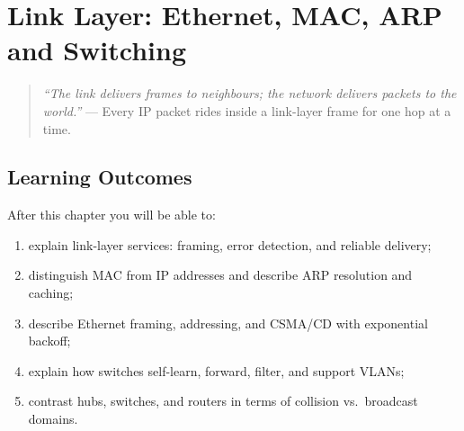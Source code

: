 \chapter{Link Layer: Ethernet, MAC, ARP and Switching}\label{ch:link}
\begin{quote}
\emph{``The link delivers frames to neighbours; the network delivers packets to the world.''} --- Every IP packet rides inside a link-layer frame for one hop at a time.
\end{quote}
\noindent{}
\vspace{0.4em}
\section*{Learning Outcomes}
After this chapter you will be able to:
\begin{enumerate}[label=(L\arabic*)]
    \item explain link-layer services: framing, error detection, and reliable delivery;
    \item distinguish MAC from IP addresses and describe ARP resolution and caching;
    \item describe Ethernet framing, addressing, and CSMA/CD with exponential backoff;
    \item explain how switches self-learn, forward, filter, and support VLANs;
    \item contrast hubs, switches, and routers in terms of collision vs.\ broadcast domains.
\end{enumerate}
